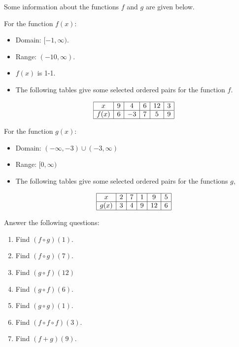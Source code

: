 \documentclass{ximera}
\begin{document}
\begin{exercise}
Some information about the functions $f$ and $g$ are given below.

For the function $f(x)$:
\begin{itemize}
\item Domain: $[-1, \infty)$.
\item Range: $(-10, \infty)$.
\item $f(x)$ is 1-1.
\item The following tables give some selected ordered pairs for the function $f$. 
\noindent
\begin{center}
\[\begin{array}{|c|c|c|c|c|c|}
\hline
x & 9 & 4 & 6& 12 & 3\\
\hline
f(x)& 6 & -3& 7& 5&9\\
\hline
\end{array}\]
\end{center}
\end{itemize}


For the function $g(x)$:
\begin{itemize}
\item Domain: $(-\infty, -3)\cup(-3, \infty)$
\item Range: $[0, \infty)$
\item The following tables give some selected ordered pairs for the functions $g$, 
\noindent
\begin{center}
\[\begin{array}{|c|c|c|c|c|c|}
\hline
x & 2 & 7 & 1& 9 & 5\\
\hline
g(x)& 3 & 4& 9&12&6\\
\hline
\end{array}\]
\end{center}
\end{itemize}

Answer the following questions: 
\begin{enumerate}
\item Find $(f\circ g)(1)$.
\item Find $(f\circ g)(7)$. 
\item Find $(g\circ f)(12)$
\item Find $(g\circ f)(6)$. 
\item Find $(g\circ g)(1)$.
\item Find  $(f\circ f\circ f)(3)$. 
\item Find $(f+g)(9)$.


\end{enumerate}
\end{exercise}
\end{document}
